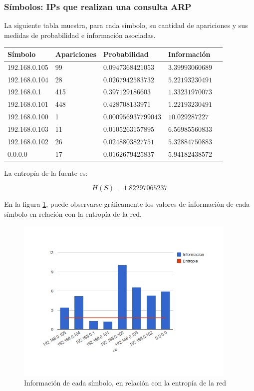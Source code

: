 \documentclass{article}
\begin{document}
\subsubsection{Símbolos: IPs que realizan una consulta ARP}
La siguiente tabla muestra, para cada símbolo, su cantidad de apariciones y
sus medidas de probabilidad e información asociadas.

\vskip10pt

\begin{tabular}{|l|l|l|l|l|}
  \hline
  Símbolo & Apariciones & Probabilidad & Información \\
  \hline
  192.168.0.105 & 99 & $0.0947368421053$ & $3.39993060689$ \\
  \hline
  192.168.0.104 & 28 & $0.0267942583732$ & $5.22193230491$ \\
  \hline
  192.168.0.1 & 415 & $0.397129186603$  & $1.33231970073$ \\
  \hline
  192.168.0.101 & 448 & $0.428708133971$ & $1.22193230491$ \\
  \hline
  192.168.0.100 & 1 & $0.000956937799043$ & $10.029287227$ \\
  \hline
  192.168.0.103 & 11 & $0.0105263157895$ & $6.56985560833$ \\
  \hline
  192.168.0.102 & 26 & $0.0248803827751$ & $5.32884750883$ \\
  \hline
  0.0.0.0 & 17 & $0.0162679425837$ & $5.94182438572$ \\
  \hline
\end{tabular}

\vskip10pt

La entropía de la fuente es:

$$H(S) = 1.82297065237$$

En la figura \ref{fig:red1requesters:infoentro}, puede observarse gráficamente
los valores de información de cada símbolo en relación con la entropía de la
red.

\begin{figure}[h!]
    \centering                                                       
    \includegraphics[width=300pt]{consultas1.png}
    \caption{Información de cada símbolo, en relación con la
        entropía de la red}
    \label{fig:red1requesters:infoentro}
\end{figure}
\end{document}
